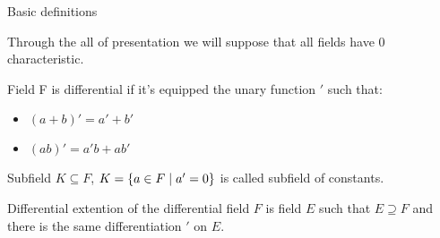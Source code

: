 \documentclass[10pt]{beamer}
\renewcommand{\|}{\ensuremath{\hspace{0.1cm} | \hspace{0.1cm}}}
\begin{document}
    \begin{frame}{Basic definitions}
        \begin{remark}
            Through the all of presentation we will suppose that all fields have 0 characteristic.
        \end{remark}
        \begin{definition}
            Field F is differential if it's equipped the unary function $'$ such that:
            \begin{itemize}
                \item $(a+b)' = a' + b'$
                \item $(ab)' = a'b + ab'$
            \end{itemize}
        \end{definition}
        \begin{definition}
            Subfield $K\subseteq F$, $K = \{ a \in F \| a' = 0 \}$ is called subfield of constants.
        \end{definition}
        \begin{definition}
            Differential extention of the differential field $F$ is field $E$ such that $E\supseteq F$ and there is the same differentiation $'$ on $E$.
        \end{definition}
    \end{frame}
\end{document}
